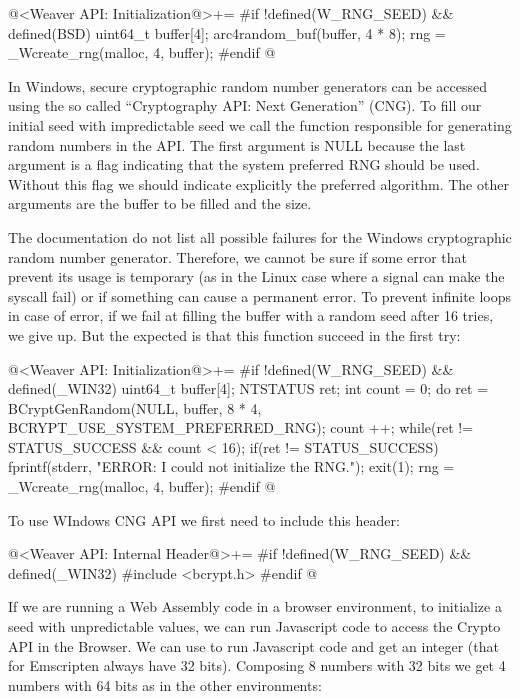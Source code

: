 \iniciocodigo
@<Weaver API: Initialization@>+=
#if !defined(W_RNG_SEED) && defined(BSD)
{
  uint64_t buffer[4];
  arc4random_buf(buffer, 4 * 8);
  rng = _Wcreate_rng(malloc, 4, buffer);
}
#endif
@
\fimcodigo

In Windows, secure cryptographic random number generators can be
accessed using the so called ``Cryptography API: Next Generation''
(CNG). To fill our initial seed with impredictable seed we call the
function responsible for generating random numbers in the API. The
first argument is NULL because the last argument is a flag indicating
that the system preferred RNG should be used. Without this flag we
should indicate explicitly the preferred algorithm. The other
arguments are the buffer to be filled and the size.

The documentation do not list all possible failures for the Windows
cryptographic random number generator. Therefore, we cannot be sure if
some error that prevent its usage is temporary (as in the Linux case
where a signal can make the syscall  fail) or if
something can cause a permanent error. To prevent infinite loops in
case of error, if we fail at filling the buffer with a random seed
after 16 tries, we give up. But the expected is that this function
succeed in the first try:

\iniciocodigo
@<Weaver API: Initialization@>+=
#if !defined(W_RNG_SEED) && defined(_WIN32)
{
  uint64_t buffer[4];
  NTSTATUS ret;
  int count = 0;
  do{
    ret = BCryptGenRandom(NULL, buffer, 8 * 4,
                          BCRYPT_USE_SYSTEM_PREFERRED_RNG);
    count ++;
  } while(ret != STATUS_SUCCESS && count < 16);
  if(ret != STATUS_SUCCESS){
    fprintf(stderr, "ERROR: I could not initialize the RNG.\n");
    exit(1);
  }
  rng = _Wcreate_rng(malloc, 4, buffer);
}
#endif
@
\fimcodigo

To use WIndows CNG API we first need to include this header:

\iniciocodigo
@<Weaver API: Internal Header@>+=
#if !defined(W_RNG_SEED) && defined(_WIN32)
#include <bcrypt.h>
#endif
@
\fimcodigo

If we are running a Web Assembly code in a browser environment, to
initialize a seed with unpredictable values, we can run Javascript
code to access the Crypto API in the Browser. We can
use  to run Javascript code and get an
integer (that for Emscripten always have 32 bits). Composing 8 numbers
with 32 bits we get 4 numbers with 64 bits as in the other
environments:

